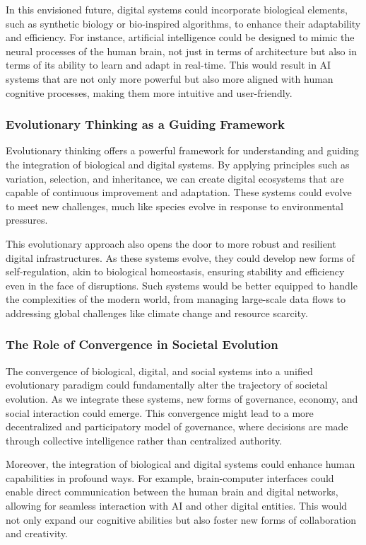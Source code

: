 \documentclass[12pt,twoside]{article}
\begin{document}
In this envisioned future, digital systems could incorporate biological elements, such as synthetic biology or bio-inspired algorithms, to enhance their adaptability and efficiency. For instance, artificial intelligence could be designed to mimic the neural processes of the human brain, not just in terms of architecture but also in terms of its ability to learn and adapt in real-time. This would result in AI systems that are not only more powerful but also more aligned with human cognitive processes, making them more intuitive and user-friendly.

\subsubsection{Evolutionary Thinking as a Guiding Framework}
Evolutionary thinking offers a powerful framework for understanding and guiding the integration of biological and digital systems. By applying principles such as variation, selection, and inheritance, we can create digital ecosystems that are capable of continuous improvement and adaptation. These systems could evolve to meet new challenges, much like species evolve in response to environmental pressures.

This evolutionary approach also opens the door to more robust and resilient digital infrastructures. As these systems evolve, they could develop new forms of self-regulation, akin to biological homeostasis, ensuring stability and efficiency even in the face of disruptions. Such systems would be better equipped to handle the complexities of the modern world, from managing large-scale data flows to addressing global challenges like climate change and resource scarcity.

\subsubsection{The Role of Convergence in Societal Evolution}

The convergence of biological, digital, and social systems into a unified evolutionary paradigm could fundamentally alter the trajectory of societal evolution. As we integrate these systems, new forms of governance, economy, and social interaction could emerge. This convergence might lead to a more decentralized and participatory model of governance, where decisions are made through collective intelligence rather than centralized authority.

Moreover, the integration of biological and digital systems could enhance human capabilities in profound ways. For example, brain-computer interfaces could enable direct communication between the human brain and digital networks, allowing for seamless interaction with AI and other digital entities. This would not only expand our cognitive abilities but also foster new forms of collaboration and creativity.
\end{document}
